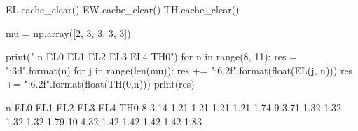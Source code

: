 
EL.cache_clear()
EW.cache_clear()
TH.cache_clear()

mu = np.array([2, 3, 3, 3, 3])

print(" n  EL0  EL1  EL2   EL3   EL4 TH0")
for n in range(8, 11):
    res = "{:3d}".format(n)
    for j in range(len(mu)):
        res += "{:6.2f}".format(float(EL(j, n)))
    res += "{:6.2f}".format(float(TH(0,n)))
    print(res)

 n  EL0  EL1  EL2   EL3   EL4 TH0
  8  3.14  1.21  1.21  1.21  1.21  1.74
  9  3.71  1.32  1.32  1.32  1.32  1.79
 10  4.32  1.42  1.42  1.42  1.42  1.83

